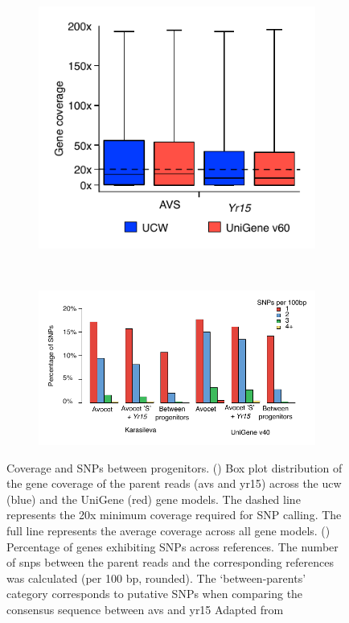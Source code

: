 \begin{figure}
\centering
\begin{subfigure}{0.38\textwidth}
    \caption{}
     \includegraphics[width=1\textwidth]{Yr15/Figures/CoveragePerGene.pdf} 
    \label{fig:yr15:covPerGene}
\end{subfigure}
~
\begin{subfigure}{0.58\textwidth}
    \caption{}
    \includegraphics[width=1\textwidth]{Yr15/Figures/PercentageOfSnps.pdf} 
    
    \label{fig:yr15:SNPper}
\end{subfigure}
\caption[Coverage and SNPs between progenitors]{Coverage and SNPs between progenitors. () Box plot distribution of the gene coverage of the parent reads (\gls{avs} and \gls{yr15}) across the \acrshort{ucw} (blue) and the UniGene (red) gene models. The dashed line represents the 20x minimum coverage required for SNP calling. The full line represents the average coverage across all gene models. () Percentage of genes exhibiting SNPs across references. The number of \gls{snp}s between the parent reads and the corresponding references was calculated (per 100 bp, rounded). The ‘between-parents’ category corresponds to putative SNPs when comparing the consensus sequence between \gls{avs} and \gls{yr15} Adapted from \citet{Ramirez-Gonzalez2015b} }
\end{figure}



